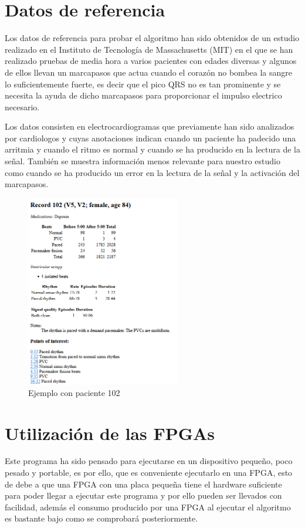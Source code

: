 \section{Datos de referencia}
Los datos de referencia para probar el algoritmo han sido obtenidos de un estudio realizado en el Instituto de Tecnología de Massachusetts (MIT)
en el que se han realizado pruebas de media hora a varios pacientes con edades diversas y algunos de ellos llevan un marcapasos
que actua cuando el corazón no bombea la sangre lo suficientemente fuerte, es decir que el pico QRS no es tan prominente
y se necesita la ayuda de dicho marcapasos para proporcionar el impulso electrico necesario.

Los datos consisten en electrocardiogramas que previamente han sido analizados por cardiologos y cuyas anotaciones indican cuando un paciente ha padecido 
una arritmia y cuando el ritmo es normal y cuando se ha producido en la lectura de la señal. También se muestra información menos relevante para nuestro 
estudio como cuando se ha producido un error en la lectura de la señal y la activación del marcapasos.

\begin{figure}[h]
	\centering
	\includegraphics[width=0.6\textwidth]{./Images/img_introduccion/Paciente_pruebas_MIT.png}
	\caption{Ejemplo con paciente 102}
	\label{fig:Paciente_pruebas_MIT}
\end{figure}

\section{Utilización de las FPGAs}
Este programa ha sido pensado para ejecutarse en un dispositivo pequeño, poco pesado y portable, es por ello, que es conveniente ejecutarlo en 
una FPGA, esto de debe a que una FPGA con una placa pequeña tiene el hardware suficiente para poder llegar a ejecutar este programa y por ello pueden
ser llevados con facilidad, además el consumo producido por una FPGA al ejecutar el algoritmo es bastante bajo como se comprobará posteriormente.

